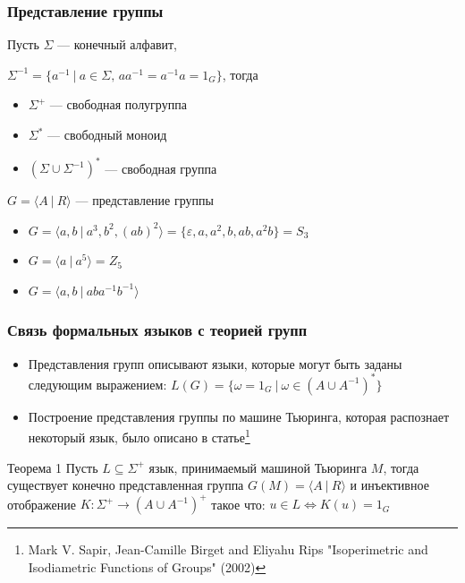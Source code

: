 \documentclass[xcolor=table]{beamer}
\begin{document}
\begin{frame}[fragile]
 \frametitle{Представление группы}
        Пусть $\Sigma$ --- конечный алфавит,
        
        $\Sigma^{-1} = \{ a^{-1}~|~a \in \Sigma, \, 
        a a^{-1} = a^{-1} a = 1_G \}$, тогда
    \begin{itemize}
        \item $\Sigma^+$ --- свободная полугруппа
        \item $\Sigma^*$ --- свободный моноид
        \item $(\Sigma \cup \Sigma^{-1})^*$ --- свободная группа
    \end{itemize}
    
    \pause
        $G = \langle A~|~R \rangle$ --- представление группы
    \begin{itemize}
        \item $G = \langle a, b~|~a^3, b^2, (ab)^2 \rangle = \{\varepsilon, a, a^2, b, ab, a^2b\} = S_3$
        \item $G = \langle a~|~a^5\rangle = Z_5$
        \item $G = \langle a, b~|~aba^{-1}b^{-1} \rangle$
    \end{itemize}
\end{frame}

\begin{frame}[fragile]
 \frametitle{Связь формальных языков с теорией групп}
    \begin{itemize}
        \item Представления групп описывают языки, которые могут быть заданы следующим выражением: $L(G) = \{\omega = 1_G ~|~ \omega \in (A \cup A^{-1})^*\}$
        \item Построение представления группы по машине Тьюринга, которая распознает некоторый язык, было описано в статье\footnote{Mark V. Sapir, Jean-Camille Birget and Eliyahu Rips "Isoperimetric and Isodiametric Functions of Groups" (2002)}
    \end{itemize}
    \begin{block}{Теорема 1}
		Пусть $L \subseteq \Sigma^+$ язык, принимаемый машиной Тьюринга $M$,
    тогда существует конечно представленная группа $G(M)=\langle A~|~R \rangle$
    и инъективное отображение $K: \Sigma^+ \to (A \cup A^{-1})^+$ такое что:
    $u \in L \iff K(u)=1_G$
	\end{block}
\end{frame}
\end{document}
